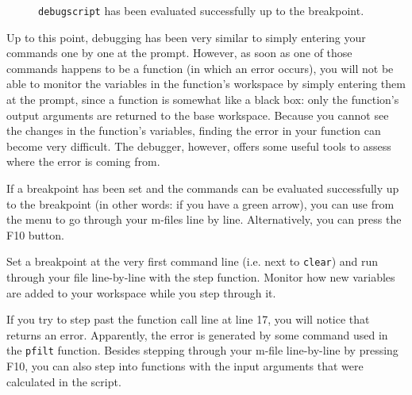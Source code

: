 \begin{figure}[!ht]
  \centering
  \caption{{\tt debugscript} has been evaluated successfully up to the breakpoint.}\label{fig:run-to-breakpoint}
\end{figure}

\vspace{1em}
\noindent Up to this point, debugging has been very similar to simply entering your commands one by one at the prompt. However, as soon as one of those commands happens to be a function (in which an error occurs), you will not be able to monitor the variables in the function's workspace by simply entering them at the prompt, since a function is somewhat like a black box: only the function's output arguments are returned to the base workspace. Because you cannot see the changes in the function's variables, finding the error in your function can become very difficult. The debugger, however, offers some useful tools to assess where the error is coming from.

If a breakpoint has been set and the commands can be evaluated successfully up to the breakpoint (in other words: if you have a green arrow), you can use  from the  menu to go through your m-files line by line. Alternatively, you can press the F10 button. 

\begin{action}
Set a breakpoint at the very first command line (i.e. next to {\tt clear}) and run through your file line-by-line with the step function. Monitor how new variables are added to your workspace while you step through it.
\end{action}
\noindent If you try to step past the function call line at line 17, you will notice that \MATLAB{} returns an error. Apparently, the error is generated by some command used in the {\tt pfilt} function. Besides stepping through your m-file line-by-line by pressing F10, you can also step into functions with the input arguments that were calculated in the script.

